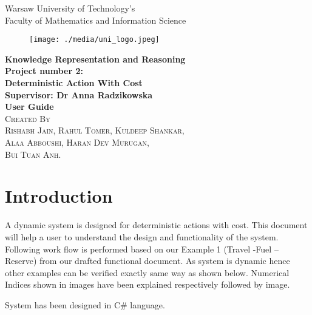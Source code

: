 \documentclass[11pt]{article}
\begin{document}
	\begin{titlepage}
		\begin{center}
			\Large{Warsaw University of Technology's}\\
			\Large{Faculty of Mathematics and Information Science}\\
			[0.3in]
			\begin{figure}[H]
				\centering
				\texttt{[image: ./media/uni\_logo.jpeg]}
				\label{Figure:f04}
			\end{figure}
			\Large{\bfseries Knowledge Representation and Reasoning}\\
			[0.3in]
			\Large{\bfseries Project number 2:}\\
			\Large{\bfseries Deterministic Action With Cost}\\
			\Large{\bfseries Supervisor: Dr Anna Radzikowska}\\
			[0.3in]
			\Large{\bfseries User Guide}\\
			[0.3in]
			\textsc{\Large{Created By}\\
				Rishabh Jain,
				Rahul Tomer,
				Kuldeep Shankar,\\ 
				Alaa Abboushi,
				Haran Dev Murugan,\\
				Bui Tuan Anh.\\}
		\end{center}	
	\end{titlepage}
	\tableofcontents
	\newpage
	\section{Introduction}\label{sec:intro}
	A dynamic system is designed for deterministic actions with cost. This document will help a user to understand the design and functionality of the system.
Following work flow is performed based on our Example 1 (Travel -Fuel – Reserve) from our drafted functional document. As system is dynamic hence other examples can be verified exactly same way as shown below.
Numerical Indices shown in images have been explained respectively followed by image.

System has been designed in C\# language.
\end{document}
